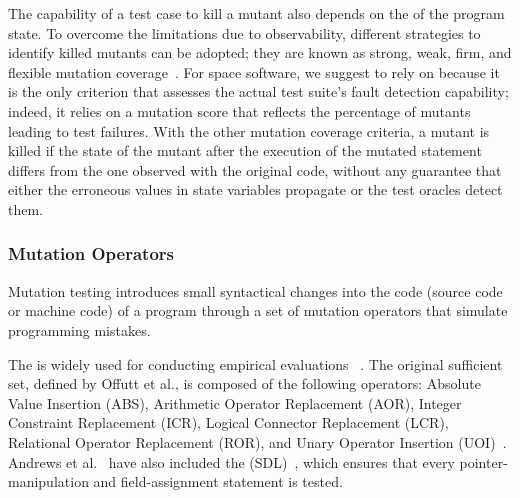 The capability of a test case to kill a mutant also depends on the  of the program state. To overcome the limitations due to observability, different strategies to identify killed mutants can be adopted; they are known as strong, weak, firm, and flexible mutation coverage~\cite{ammann2016introduction}. For space software, we suggest to rely on  because it is the only criterion that assesses the actual test suite's fault detection capability; indeed, it relies on a mutation score that reflects the percentage of mutants leading to test failures. With the other mutation coverage criteria, a mutant is killed if the state of the mutant after the execution of the mutated statement differs from the one observed with the original code, without any guarantee that either the erroneous values in state variables propagate or the test oracles detect them. 




\subsubsection{Mutation Operators}
\label{sec:related:operators}

%


Mutation testing introduces small syntactical changes into the code (source code or machine code) of a program through a set of mutation operators that simulate programming mistakes. 



The   is widely used for conducting empirical evaluations ~\cite{offutt1996experimental,rothermel1996experimental,andrews2005mutation,kintis2017detecting}. 
The original sufficient set, defined by Offutt et al., is composed of the following operators: Absolute Value Insertion (ABS), Arithmetic Operator Replacement (AOR), Integer Constraint Replacement (ICR), Logical Connector Replacement (LCR), Relational Operator Replacement (ROR), and Unary Operator Insertion (UOI)~\cite{offutt1996experimental}.
Andrews et al.~\cite{andrews2005mutation} have also included the 
 (SDL)~\cite{delamaro2014designing}, which ensures that every pointer-manipulation and field-assignment statement is tested. 

